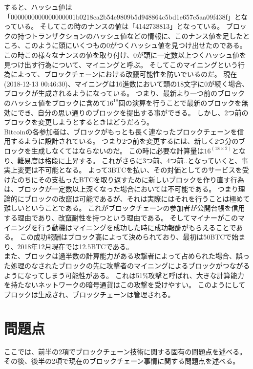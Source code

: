 すると、ハッシュ値は「0000000000000000001b0218ca2b54e9809b5d948864c5bd1e657e5aa09f438f」となっている。
そしてこの時のナンスの値は「4142738813」となっている。
ブロックの持つトランザクションのハッシュ値などの情報に、このナンス値を足したところ、このように頭にいくつもの0がつくハッシュ値を見つけ出せたのである。
この時この様々なナンスの値を取り付け、0が頭に一定数以上つくハッシュ値を見つけ出す行為について、マイニングと呼ぶ。
そしてこのマイニングという行為によって、ブロックチェーンにおける改竄可能性を防いでいるのだ。
現在(2018-12-13 00:46:30)、マイニングは16進数において頭の18文字に0が続く場合、ブロックが生成されるようになっている。
つまり、最新より一つ前のブロックのハッシュ値をブロックに含めて\(16^18\)回の演算を行うことで最新のブロックを無効にでき、自分の思い通りのブロックを提出する事ができる。
しかし、2つ前のブロックを変更しようとするときはどうだろう。 \\
Bitcoinの各参加者は、ブロックがもっとも長く連なったブロックチェーンを信用するように設計されている。
つまり2つ前を変更するには、新しく2つ分のブロックを生成しなくてはならないのだ。
この時に必要な計算量は\(16^(18\times2) \)となり、難易度は格段に上昇する。
これがさらに3つ前、4つ前..となっていくと、事実上変更は不可能となる。
よって3BTCを払い、その対価としてのサービスを受けたのちにその支払ったBTCを取り返すために新しいブロックを作り直す行為は、ブロックが一定数以上深くなった場合においては不可能である。
つまり理論的にブロックの改竄は可能であるが、それは実際にはそれを行うことは極めて難しいということである。
これがブロックチェーンの参加者が公開台帳を信用する理由であり、改竄耐性を持つという理由である。
そしてマイナーがこのマイニングを行う動機はマイニングを成功した時に成功報酬がもらえることである。
この成功報酬はブロック高によって決められており、最初は50BTCで始まり、2018年12月現在では12.5BTCである。 \\
また、ブロックは過半数の計算能力がある攻撃者によって占められた場合、誤った処理のなされたブロックの先に攻撃者のマイニングによるブロックがつながるようになってしまう可能性がある。
これは51\%攻撃と呼ばれ、大きな計算能力を持たないネットワークの暗号通貨はこの攻撃を受けやすい。
このようにしてブロックは生成され、ブロックチェーンは管理される。

\section{問題点}
ここでは、前半の2項でブロックチェーン技術に関する固有の問題点を述べる。
その後、後半の2項で現在のブロックチェーン事情に関する問題点を述べる。

